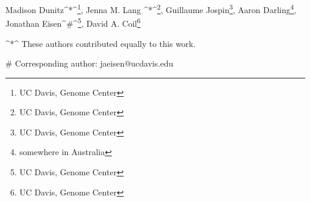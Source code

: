 Madison Dunitz^*^\footnote{UC Davis, Genome Center}, Jenna M. Lang ^*^\footnote{UC Davis, Genome Center}, Guillaume Jospin\footnote{UC Davis, Genome Center}, Aaron Darling\footnote{somewhere in Australia}, Jonathan Eisen^\#^\footnote{UC Davis, Genome Center}, David A. Coil\footnote{UC Davis, Genome Center} 

^*^ These authors contributed equally to this work.

# Corresponding author: jaeisen@ucdavis.edu